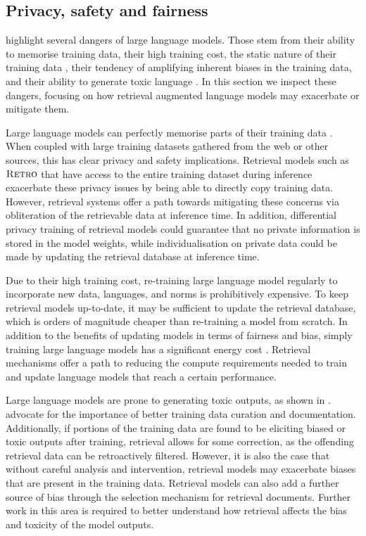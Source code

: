 \documentclass[11pt, a4paper, logo]{deepmind}
\newcommand{\retro}{\textsc{Retro}\xspace}
\begin{document}
\subsection{Privacy, safety and fairness}

\citet{bender2021dangers, weidinger2021harms} highlight several dangers of large language models. Those stem from their ability to memorise training data, their high training cost, the static nature of their training data \citep{lazaridou2021pitfalls}, their tendency of amplifying inherent biases in the training data, and their ability to generate toxic language \citep{gehman2020realtoxicityprompts}. 
In this section we inspect these dangers, focusing on how retrieval augmented language models may exacerbate or mitigate them.

Large language models can perfectly memorise parts of their training data \citep{carlini2021extracting}.
When coupled with large training datasets gathered from the web or other sources, this has clear privacy and safety implications.
Retrieval models such as $\retro$ that have access to the entire training dataset during inference exacerbate these privacy issues by being able to directly copy training data.
However, retrieval systems offer a path towards mitigating these concerns via obliteration of the retrievable data at inference time.
In addition, differential privacy training \citep{abadi2016differentialprivacy} of retrieval models could guarantee that no private information is stored in the model weights, while individualisation on private data could be made by updating the retrieval database at inference time.

Due to their high training cost, re-training large language model regularly to incorporate new data, languages, and norms is prohibitively expensive.
To keep retrieval models up-to-date, it may be sufficient to update the retrieval database, which is orders of magnitude cheaper than re-training a model from scratch.
In addition to the benefits of updating models in terms of fairness and bias, simply training large language models has a significant energy cost \citep{strubell2019energy, green_ai}.
Retrieval mechanisms offer a path to reducing the compute requirements needed to train and update language models that reach a certain performance.

Large language models are prone to generating toxic outputs, as shown in  \citet{gehman2020realtoxicityprompts}.
\citet{bender2021dangers, jo2020lessons} advocate for the importance of better training data curation and documentation.
Additionally, if portions of the training data are found to be eliciting biased or toxic outputs after training, retrieval allows for some correction, as the offending retrieval data can be retroactively filtered.
However, it is also the case that without careful analysis and intervention, retrieval models may exacerbate biases that are present in the training data.
Retrieval models can also add a further source of bias through the selection mechanism for retrieval documents.
Further work in this area is required to better understand how retrieval affects the bias and toxicity of the model outputs.
\end{document}
